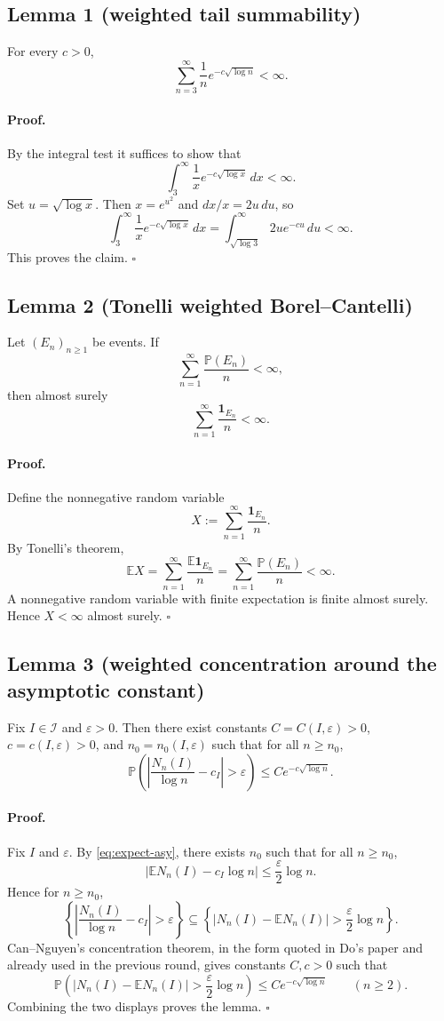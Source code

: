 \subsection*{Lemma 1 (weighted tail summability)}
For every $c>0$,
\[
\sum_{n=3}^{\infty}\frac{1}{n}e^{-c\sqrt{\log n}}<\infty.
\]

\paragraph{Proof.}
By the integral test it suffices to show that
\[
\int_3^{\infty}\frac{1}{x}e^{-c\sqrt{\log x}}\,dx<\infty.
\]
Set $u=\sqrt{\log x}$. Then $x=e^{u^2}$ and $dx/x=2u\,du$, so
\[
\int_3^{\infty}\frac{1}{x}e^{-c\sqrt{\log x}}\,dx
=
\int_{\sqrt{\log 3}}^{\infty}2u e^{-cu}\,du<\infty.
\]
This proves the claim.
\hfill$\square$

\subsection*{Lemma 2 (Tonelli weighted Borel--Cantelli)}
Let $(E_n)_{n\ge1}$ be events. If
\[
\sum_{n=1}^{\infty}\frac{\mathbb P(E_n)}{n}<\infty,
\]
then almost surely
\[
\sum_{n=1}^{\infty}\frac{\mathbf 1_{E_n}}{n}<\infty.
\]

\paragraph{Proof.}
Define the nonnegative random variable
\[
X:=\sum_{n=1}^{\infty}\frac{\mathbf 1_{E_n}}{n}.
\]
By Tonelli's theorem,
\[
\mathbb E X
=
\sum_{n=1}^{\infty}\frac{\mathbb E\mathbf 1_{E_n}}{n}
=
\sum_{n=1}^{\infty}\frac{\mathbb P(E_n)}{n}<\infty.
\]
A nonnegative random variable with finite expectation is finite almost surely. Hence $X<\infty$ almost surely.
\hfill$\square$

\subsection*{Lemma 3 (weighted concentration around the asymptotic constant)}
Fix $I\in\mathcal I$ and $\varepsilon>0$. Then there exist constants $C=C(I,\varepsilon)>0$, $c=c(I,\varepsilon)>0$, and $n_0=n_0(I,\varepsilon)$ such that for all $n\ge n_0$,
\[
\mathbb P\left(\left|\frac{N_n(I)}{\log n}-c_I\right|>\varepsilon\right)
\le C e^{-c\sqrt{\log n}}.
\]

\paragraph{Proof.}
Fix $I$ and $\varepsilon$. By \eqref{eq:expect-asy}, there exists $n_0$ such that for all $n\ge n_0$,
\[
\left|\mathbb E N_n(I)-c_I\log n\right|\le \frac{\varepsilon}{2}\log n.
\]
Hence for $n\ge n_0$,
\[
\left\{\left|\frac{N_n(I)}{\log n}-c_I\right|>\varepsilon\right\}
\subseteq
\left\{\left|N_n(I)-\mathbb E N_n(I)\right|>\frac{\varepsilon}{2}\log n\right\}.
\]
Can--Nguyen's concentration theorem, in the form quoted in Do's paper and already used in the previous round, gives constants $C,c>0$ such that
\[
\mathbb P\left(\left|N_n(I)-\mathbb E N_n(I)\right|>\frac{\varepsilon}{2}\log n\right)
\le C e^{-c\sqrt{\log n}}
\qquad(n\ge2).
\]
Combining the two displays proves the lemma.
\hfill$\square$

